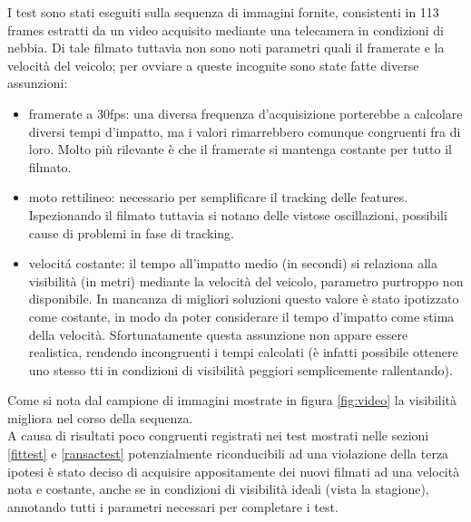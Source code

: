 \documentclass[12pt]{report}
\begin{document}
\noindent I test sono stati eseguiti sulla sequenza di immagini fornite, consistenti in 113 frames estratti da un video acquisito mediante una telecamera in condizioni di nebbia. Di tale filmato tuttavia non sono noti parametri quali il framerate e la velocit\`a del veicolo; per ovviare a queste incognite sono state fatte diverse assunzioni:
\begin{itemize}
	\item	framerate a 30fps: una diversa frequenza d'acquisizione porterebbe a calcolare diversi tempi d'impatto, ma i valori rimarrebbero comunque congruenti fra di loro. Molto pi\`u rilevante \`e che il framerate si mantenga costante per tutto il filmato.
	\item	moto rettilineo: necessario per semplificare il tracking delle features. Ispezionando il filmato tuttavia si notano delle vistose oscillazioni, possibili cause di problemi in fase di tracking.
	\item	velocit\'a costante: il tempo all'impatto medio (in secondi) si relaziona alla visibilit\`a (in metri) mediante la velocit\`a del veicolo, parametro purtroppo non disponibile. In mancanza di migliori soluzioni questo valore \`e stato ipotizzato come costante, in modo da poter considerare il tempo d'impatto come stima della velocit\`a. Sfortunatamente questa assunzione non appare essere realistica, rendendo incongruenti i tempi calcolati (\`e infatti possibile ottenere uno stesso tti in condizioni di visibilit\`a peggiori semplicemente rallentando).
\end{itemize}
\noindent Come si nota dal campione di immagini mostrate in figura \ref{fig:video} la visibilit\`a migliora nel corso della sequenza.\\

\noindent A causa di risultati poco congruenti registrati nei test mostrati nelle sezioni \ref{fittest} e \ref{ransactest} potenzialmente riconducibili ad una violazione della terza ipotesi \`e stato deciso di acquisire appositamente dei nuovi filmati ad una velocit\`a nota e costante, anche se in condizioni di visibilit\`a ideali (vista la stagione), annotando tutti i parametri necessari per completare i test.\\
\end{document}
